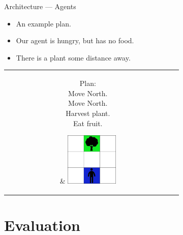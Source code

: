 \documentclass{beamer}
\begin{document}
   \begin{frame}{Architecture --- Agents}
      \begin{itemize}
         \item An example plan.
         \item Our agent is hungry, but has no food.
         \item There is a plant some distance away.
      \end{itemize}
      
      \medskip
      
      \begin{tabular}{c c}
         \hspace{1cm}\parbox{0.4\textwidth}{\vspace{-3cm}
                                 Plan:\\
                                 Move North.\\
                                 Move North.\\
                                 Harvest plant.\\
                                 Eat fruit.\\}

           & \includegraphics[width=0.3\textwidth]{hungry_agent.png}
      \end{tabular}
   \end{frame}
   
   \section{Evaluation}
   
\end{document}
